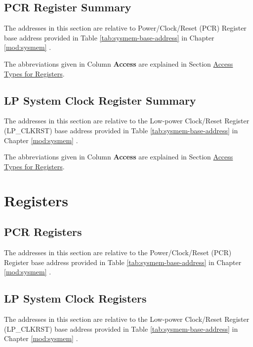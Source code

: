\documentclass[main\_\_EN.tex]{subfiles}
\begin{document}
\subsection{PCR Register Summary}
\label{subsec:resclk-pcr-reg-summ}

The addresses in this section are relative to Power/Clock/Reset (PCR) Register base address provided in Table \ref{tab:sysmem-base-address} in Chapter \ref{mod:sysmem} \textit{}.

The abbreviations given in Column \textbf{Access} are explained in Section \hyperref[glossary-access-types]{Access Types for Registers}.



\subsection{LP System Clock Register Summary}
\label{subsec:resclk-lp-reg-summ}

The addresses in this section are relative to the Low-power Clock/Reset Register (LP\_CLKRST) base address provided in Table \ref{tab:sysmem-base-address} in Chapter \ref{mod:sysmem} \textit{}.

The abbreviations given in Column \textbf{Access} are explained in Section \hyperref[glossary-access-types]{Access Types for Registers}.






\newpage
\section{Registers}

\subsection{PCR Registers}


The addresses in this section are relative to the Power/Clock/Reset (PCR) Register base address provided in Table \ref{tab:sysmem-base-address} in Chapter \ref{mod:sysmem} \textit{}.





\subsection{LP System Clock Registers}


The addresses in this section are relative to the Low-power Clock/Reset Register (LP\_CLKRST) base address provided in Table \ref{tab:sysmem-base-address} in Chapter \ref{mod:sysmem} \textit{}.



\end{document}
